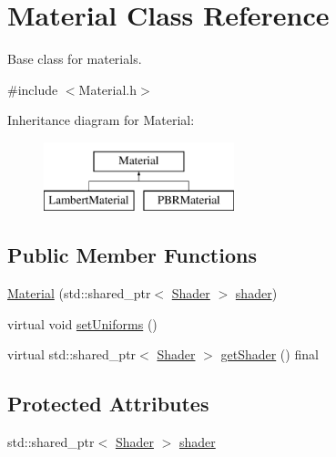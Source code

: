 \hypertarget{class_material}{}\section{Material Class Reference}
\label{class_material}


Base class for materials.  




{\ttfamily \#include $<$Material.\+h$>$}

Inheritance diagram for Material\+:\begin{figure}[H]
\begin{center}
\leavevmode
\includegraphics[height=2.000000cm]{class_material}
\end{center}
\end{figure}
\subsection*{Public Member Functions}
\begin{DoxyCompactItemize}
\item 
\mbox{\hyperlink{class_material_a6c6dc52dccc57852a3763ed5a39028e5}{Material}} (std\+::shared\+\_\+ptr$<$ \mbox{\hyperlink{class_shader}{Shader}} $>$ \mbox{\hyperlink{class_material_a2528e7055a949798de91d54c259faf1e}{shader}})
\item 
virtual void \mbox{\hyperlink{class_material_a793da829d1f2daf3f3317d9b495f8b26}{set\+Uniforms}} ()
\item 
virtual std\+::shared\+\_\+ptr$<$ \mbox{\hyperlink{class_shader}{Shader}} $>$ \mbox{\hyperlink{class_material_af71678b4a7b47e3b2b7f018318d6c4c6}{get\+Shader}} () final
\end{DoxyCompactItemize}
\subsection*{Protected Attributes}
\begin{DoxyCompactItemize}
\item 
std\+::shared\+\_\+ptr$<$ \mbox{\hyperlink{class_shader}{Shader}} $>$ \mbox{\hyperlink{class_material_a2528e7055a949798de91d54c259faf1e}{shader}}
\end{DoxyCompactItemize}


